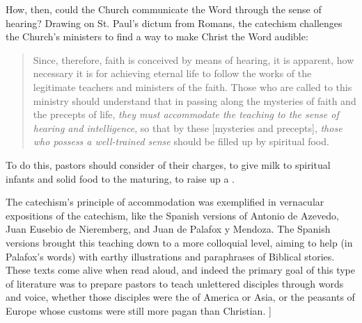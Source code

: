 How, then, could the Church communicate the Word through the sense of hearing?
Drawing on St. Paul's dictum from Romans, the catechism challenges the Church's
ministers to find a way to make Christ the Word audible: 
\begin{quote}
    Since, therefore, faith is conceived by means of hearing, it is apparent,
    how necessary it is for achieving eternal life to follow the works of the
    legitimate teachers and ministers of the faith. \Dots{} Those who are called
    to this ministry should understand that in passing along the mysteries of
    faith and the precepts of life, \emph{they must accommodate the teaching to
    the sense of hearing and intelligence}, so that by these [mysteries and
    precepts], \emph{those who possess a well-trained sense} should be filled up
    by spiritual food.%
    \Autocite
    [2, 8--9 (emphasis added): .]
    {Catholic:Catechismus1614}
\end{quote}
To do this, pastors should consider  of their charges, to give milk to
spiritual infants and solid food to the maturing, to raise up a .%
    \Autocite
    [8: .]
    {Catholic:Catechismus1614}

The catechism's principle of accommodation was exemplified in vernacular
expositions of the catechism, like the Spanish versions of Antonio de Azevedo,
Juan Eusebio de Nieremberg, and Juan de Palafox y Mendoza.%
    \Autocites{Azevedo:Catecismo}{Nieremberg:PracticaCatecismo}{Palafox:Bocados}
The Spanish versions brought this teaching down to a more colloquial level,
aiming to help  (in Palafox's words) with
earthy illustrations and paraphrases of Biblical stories.
These texts come alive when read aloud, and indeed the primary goal of this type
of literature was to prepare pastors to teach unlettered disciples through words
and voice, whether those disciples were the  of America or Asia,
or the peasants of Europe whose customs were still more pagan than Christian.%
    \Autocite
    [On Europe as a mission front after Trent, see][60--63]
    {Kamen:EarlyModernSociety}]


